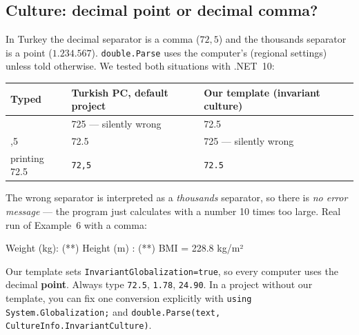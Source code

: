 \subsection{Culture: decimal point or decimal comma?}\label{sec:culture}
In Turkey the decimal separator is a comma ($72{,}5$) and the thousands separator is a point ($1.234.567$). \texttt{double.Parse} uses the computer's  (regional settings) unless told otherwise. We tested both situations with .NET~10:
\begin{center}\small
\begin{tabular}{>{\ttfamily}l l l}
\toprule
\normalfont\textbf{Typed} & \textbf{Turkish PC, default project} & \textbf{Our template (invariant culture)}\\ \midrule
72.5 & \textcolor{errc}{725 --- silently wrong} & \textcolor{repc}{72.5}\\
72,5 & \textcolor{repc}{72.5} & \textcolor{errc}{725 --- silently wrong}\\
\normalfont printing 72.5 & \texttt{72,5} & \texttt{72.5}\\ \bottomrule
\end{tabular}
\end{center}
The wrong separator is interpreted as a \emph{thousands} separator, so there is \emph{no error message} --- the program just calculates with a number 10 times too large. Real run of Example~6 with a comma:
\begin{consolebox}
\begin{run}
Weight (kg): (**)
Height (m) : (**)
BMI = 228.8 kg/m²
\end{run}
\end{consolebox}
\begin{warnbox}
Our template sets \texttt{InvariantGlobalization=true}, so every computer uses the decimal \textbf{point}. Always type \texttt{72.5}, \texttt{1.78}, \texttt{24.90}. In a project without our template, you can fix one conversion explicitly with \texttt{using System.Globalization;} and \texttt{double.Parse(text, CultureInfo.InvariantCulture)}.
\end{warnbox}


